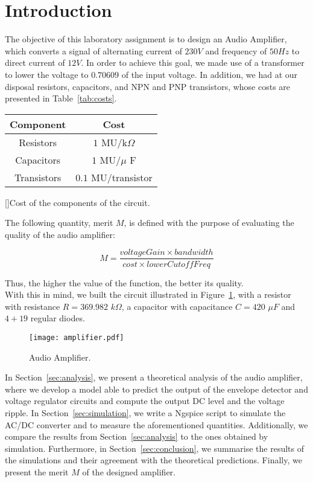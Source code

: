 \section{Introduction}
\label{sec:introduction}

The objective of this laboratory assignment is to design an Audio Amplifier, which converts a signal of alternating current of $230V$ and frequency of $50 Hz$ to direct current of $12V$. In order to achieve this goal, we made use of a transformer to lower the voltage to $0.70609$ of the input voltage. In addition, we had at our disposal resistors, capacitors, and NPN and PNP transistors, whose costs are presented in Table~\ref{tab:costs}.

\begin{center}
\begin{tabular}{ | c | c | }\label{tab:costs}
Component & Cost \\
\hline
Resistors & $1$ MU/k$\Omega$ \\  
Capacitors & $1$ MU/$\mu$ F \\
Transistors & $0.1$ MU/transistor    
\end{tabular}
[]{Cost of the components of the circuit.}
\end{center}

The following quantity, merit $M$, is defined with the purpose of evaluating the quality of the audio amplifier:

\begin{equation}
  M = \frac{voltageGain \times bandwidth}{cost \times lowerCutoffFreq}
\end{equation}

Thus, the higher the value of the function, the better its quality.\\

With this in mind, we built the circuit illustrated in Figure~\ref{fig:amplifier}, with a resistor with resistance $R = 369.982$ $k\Omega$, a capacitor with capacitance $C = 420$ $\mu F$ and $4+19$ regular diodes.

\begin{figure}[H] \centering
\texttt{[image: amplifier.pdf]}
\caption{Audio Amplifier.}
\label{fig:amplifier}
\end{figure}

In Section~\ref{sec:analysis}, we present a theoretical analysis of the audio amplifier, where we develop a model able to predict the output of the envelope detector and voltage regulator circuits and compute the output DC level and the voltage ripple. In Section~\ref{sec:simulation}, we write a Ngspice script to simulate the AC/DC converter and to measure the aforementioned quantities. Additionally, we compare the results from Section~\ref{sec:analysis} to the ones obtained by simulation. Furthermore, in Section~\ref{sec:conclusion}, we summarise the results of the simulations and their agreement with the theoretical predictions. Finally, we present the merit $M$ of the designed amplifier.

